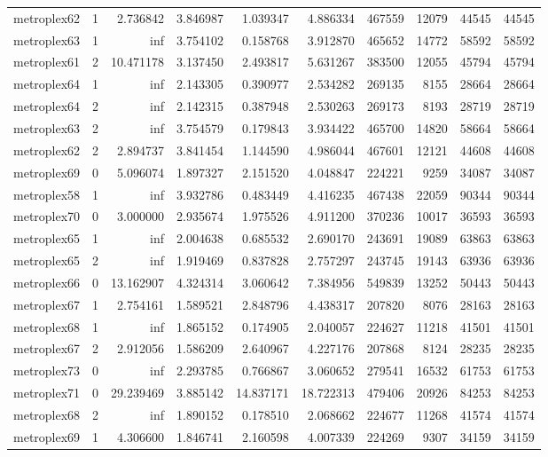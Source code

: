 \begin{longtable}{|l|r|r|r|r|r|r|r|r|r|}
metroplex62 & 1 & 2.736842 & 3.846987 & 1.039347 & 4.886334 & 467559 & 12079 & 44545 & 44545 \\
metroplex63 & 1 & inf & 3.754102 & 0.158768 & 3.912870 & 465652 & 14772 & 58592 & 58592 \\
metroplex61 & 2 & 10.471178 & 3.137450 & 2.493817 & 5.631267 & 383500 & 12055 & 45794 & 45794 \\
metroplex64 & 1 & inf & 2.143305 & 0.390977 & 2.534282 & 269135 & 8155 & 28664 & 28664 \\
metroplex64 & 2 & inf & 2.142315 & 0.387948 & 2.530263 & 269173 & 8193 & 28719 & 28719 \\
metroplex63 & 2 & inf & 3.754579 & 0.179843 & 3.934422 & 465700 & 14820 & 58664 & 58664 \\
metroplex62 & 2 & 2.894737 & 3.841454 & 1.144590 & 4.986044 & 467601 & 12121 & 44608 & 44608 \\
metroplex69 & 0 & 5.096074 & 1.897327 & 2.151520 & 4.048847 & 224221 & 9259 & 34087 & 34087 \\
metroplex58 & 1 & inf & 3.932786 & 0.483449 & 4.416235 & 467438 & 22059 & 90344 & 90344 \\
metroplex70 & 0 & 3.000000 & 2.935674 & 1.975526 & 4.911200 & 370236 & 10017 & 36593 & 36593 \\
metroplex65 & 1 & inf & 2.004638 & 0.685532 & 2.690170 & 243691 & 19089 & 63863 & 63863 \\
metroplex65 & 2 & inf & 1.919469 & 0.837828 & 2.757297 & 243745 & 19143 & 63936 & 63936 \\
metroplex66 & 0 & 13.162907 & 4.324314 & 3.060642 & 7.384956 & 549839 & 13252 & 50443 & 50443 \\
metroplex67 & 1 & 2.754161 & 1.589521 & 2.848796 & 4.438317 & 207820 & 8076 & 28163 & 28163 \\
metroplex68 & 1 & inf & 1.865152 & 0.174905 & 2.040057 & 224627 & 11218 & 41501 & 41501 \\
metroplex67 & 2 & 2.912056 & 1.586209 & 2.640967 & 4.227176 & 207868 & 8124 & 28235 & 28235 \\
metroplex73 & 0 & inf & 2.293785 & 0.766867 & 3.060652 & 279541 & 16532 & 61753 & 61753 \\
metroplex71 & 0 & 29.239469 & 3.885142 & 14.837171 & 18.722313 & 479406 & 20926 & 84253 & 84253 \\
metroplex68 & 2 & inf & 1.890152 & 0.178510 & 2.068662 & 224677 & 11268 & 41574 & 41574 \\
metroplex69 & 1 & 4.306600 & 1.846741 & 2.160598 & 4.007339 & 224269 & 9307 & 34159 & 34159 \\

\end{longtable}

